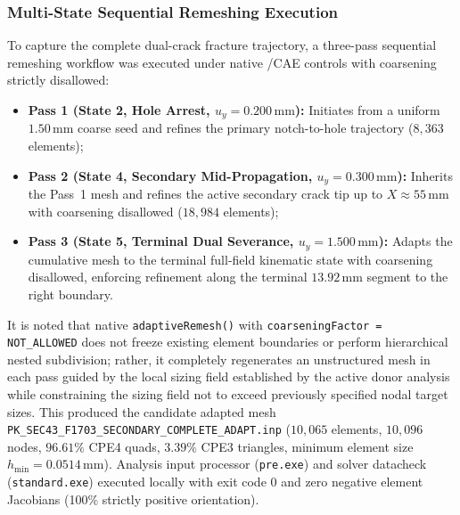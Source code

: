\subsubsection{Multi-State Sequential Remeshing Execution}
To capture the complete dual-crack fracture trajectory, a three-pass sequential remeshing workflow was executed under native \Abaqus/CAE controls with coarsening strictly disallowed:
\begin{itemize}
  \item \textbf{Pass 1 (State 2, Hole Arrest, $u_y = 0.200\,\mathrm{mm}$):} Initiates from a uniform $1.50\,\mathrm{mm}$ coarse seed and refines the primary notch-to-hole trajectory ($8{,}363$ elements);
  \item \textbf{Pass 2 (State 4, Secondary Mid-Propagation, $u_y = 0.300\,\mathrm{mm}$):} Inherits the Pass~1 mesh and refines the active secondary crack tip up to $X \approx 55\,\mathrm{mm}$ with coarsening disallowed ($18{,}984$ elements);
  \item \textbf{Pass 3 (State 5, Terminal Dual Severance, $u_y = 1.500\,\mathrm{mm}$):} Adapts the cumulative mesh to the terminal full-field kinematic state with coarsening disallowed, enforcing refinement along the terminal $13.92\,\mathrm{mm}$ segment to the right boundary.
\end{itemize}
It is noted that native \Abaqus \texttt{adaptiveRemesh()} with \texttt{coarseningFactor = NOT\_ALLOWED} does not freeze existing element boundaries or perform hierarchical nested subdivision; rather, it completely regenerates an unstructured mesh in each pass guided by the local sizing field established by the active donor analysis while constraining the sizing field not to exceed previously specified nodal target sizes. This produced the candidate adapted mesh \texttt{PK\_SEC43\_F1703\_SECONDARY\_COMPLETE\_ADAPT.inp} ($10{,}065$ elements, $10{,}096$ nodes, $96.61\%$ CPE4 quads, $3.39\%$ CPE3 triangles, minimum element size $h_{\min} = 0.0514\,\mathrm{mm}$). Analysis input processor (\texttt{pre.exe}) and solver datacheck (\texttt{standard.exe}) executed locally with exit code 0 and zero negative element Jacobians (100\% strictly positive orientation).

